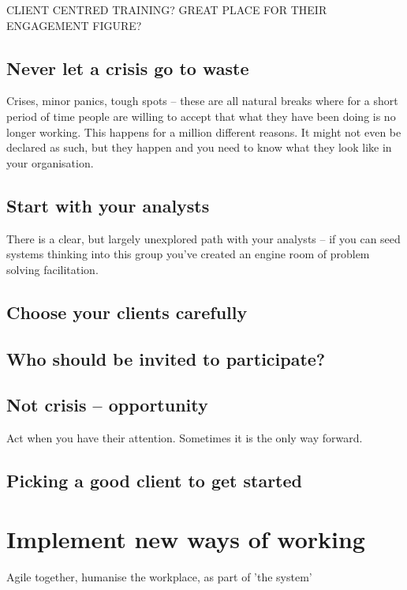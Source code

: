 CLIENT CENTRED TRAINING? GREAT PLACE FOR THEIR ENGAGEMENT FIGURE?

\subsection{Never let a crisis go to waste}
Crises, minor panics, tough spots -- these are all natural breaks where for a short period of time people are willing to accept that what they have been doing is no longer working. This happens for a million different reasons. It might not even be declared as such, but they happen and you need to know what they look like in your organisation.

\subsection{Start with your analysts}
There is a clear, but largely unexplored path with your analysts -- if you can seed systems thinking into this group you've created an engine room of problem solving facilitation.

\subsection{Choose your clients carefully}

\subsection{Who should be invited to participate?}

\subsection{Not crisis -- opportunity}
Act when you have their attention. Sometimes it is the only way forward.

\subsection{Picking a good client to get started}


\section{Implement new ways of working}
Agile together, humanise the workplace, as part of 'the system'



